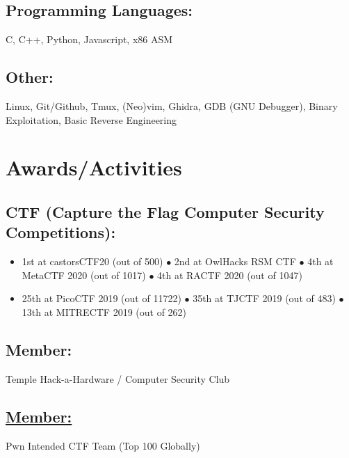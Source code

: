 \documentclass{article}
\begin{document}
\subsection{Programming Languages:}
C, C++, Python, Javascript, x86 ASM
\subsection{Other:}
Linux, Git/Github, Tmux, (Neo)vim, Ghidra, GDB (GNU Debugger), Binary Exploitation, Basic Reverse Engineering

\section{Awards/Activities}
\subsection{CTF (Capture the Flag Computer Security Competitions):}
\begin{itemize}
    \item 1st at castorsCTF20 (out of 500) $\bullet$ 2nd at OwlHacks RSM CTF $\bullet$ 4th at MetaCTF 2020 (out of 1017) $\bullet$ 4th at RACTF 2020 (out of 1047)
    \item 25th at PicoCTF 2019 (out of 11722) $\bullet$ 35th at TJCTF 2019 (out of 483) $\bullet$ 13th at MITRECTF 2019 (out of 262)
\end{itemize} 
\subsection{Member: } Temple Hack-a-Hardware / Computer Security Club 
\subsection{\href{https://ctftime.org/user/66839}{Member: }} Pwn Intended CTF Team (Top 100 Globally)
\end{document}
